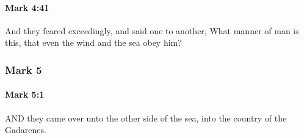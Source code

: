 		\paragraph{Mark 4:41} %
			\label{MARK-4-41}

			And they feared exceedingly, and said one to another, What manner of man is this, that even the wind and the sea obey him?

			\begin{framed}
			\scriptsize
				\begin{compactdesc}
					\item[SBLG] 
				\end{compactdesc}
			\end{framed}

	\subsubsection{Mark 5} %
		\label{MARK-5}
		
		\paragraph{Mark 5:1} %
			\label{MARK-5-1}

			AND they came over unto the other side of the sea, into the country of the Gadarenes.

